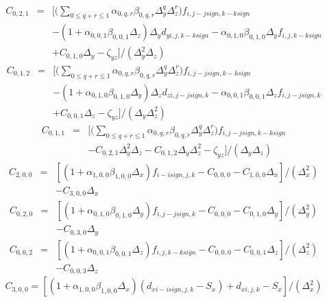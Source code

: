 \begin{eqnarray}
           C_{0,2,1}&=&{\bigg[}{\bigg(}{\sum_{\scriptstyle 0\le q+r\le 1}} \alpha_{0,q,r}\beta_{0,q,r}\Delta_y^q\Delta_z^r{\bigg)}f_{i,j-jsign,k-ksign} \nonumber \\
                  & &-(1+\alpha_{0,0,1}\beta_{0,0,1}\Delta_z)\Delta_yd_{yi,j,k-ksign}-\alpha_{0,1,0}\beta_{0,1,0}\Delta_yf_{i,j,k-ksign} \nonumber \\
                  & &+C_{0,1,0}\Delta_y-\zeta_{yz}{\bigg]}{\big /}(\Delta_y^2\Delta_z)
\end{eqnarray}
\begin{eqnarray}
           C_{0,1,2}&=&{\bigg[}{\bigg(}{\sum_{\scriptstyle 0\le q+r\le 1}} \alpha_{0,q,r}\beta_{0,q,r}\Delta_y^q\Delta_z^r{\bigg)}f_{i,j-jsign,k-ksign} \nonumber \\
                  & &-(1+\alpha_{0,1,0}\beta_{0,1,0}\Delta_y)\Delta_zd_{zi,j-jsign,k}-\alpha_{0,0,1}\beta_{0,0,1}\Delta_zf_{i,j-jsign,k} \nonumber \\
                  & &+C_{0,0,1}\Delta_z-\zeta_{yz}{\bigg]}{\big /}(\Delta_y\Delta_z^2)
\end{eqnarray}
\begin{eqnarray}
           C_{0,1,1}&=&{\bigg[}{\bigg(}{\sum_{\scriptstyle 0\le q+r\le 1}} \alpha_{0,q,r}\beta_{0,q,r}\Delta_y^q\Delta_z^r{\bigg)}f_{i,j-jsign,k-ksign} \nonumber \\
                  & &-C_{0,2,1}\Delta_y^2\Delta_z-C_{0,1,2}\Delta_y\Delta_z^2-\zeta_{yz}{\bigg]}{\big /}(\Delta_y\Delta_z)
\end{eqnarray}
\begin{eqnarray}
           C_{2,0,0}&=&[(1+\alpha_{1,0,0}\beta_{1,0,0}\Delta_x)f_{i-isign,j,k}-C_{0,0,0}-C_{1,0,0}\Delta_x]/(\Delta_x^2) \nonumber \\
           & &-C_{3,0,0}\Delta_x
\end{eqnarray}
\begin{eqnarray}
           C_{0,2,0}&=&[(1+\alpha_{0,1,0}\beta_{0,1,0}\Delta_y)f_{i,j-jsign,k}-C_{0,0,0}-C_{0,1,0}\Delta_y]/(\Delta_y^2) \nonumber \\
           & &-C_{0,3,0}\Delta_y
\end{eqnarray}
\begin{eqnarray}
           C_{0,0,2}&=&[(1+\alpha_{0,0,1}\beta_{0,0,1}\Delta_z)f_{i,j,k-ksign}-C_{0,0,0}-C_{0,0,1}\Delta_z]/(\Delta_z^2) \nonumber \\
           & &-C_{0,0,3}\Delta_z
\end{eqnarray}
\begin{equation}
           C_{3,0,0}=[(1+\alpha_{1,0,0}\beta_{1,0,0}\Delta_x)(d_{xi-isign,j,k}-S_x)+d_{xi,j,k}-S_x]/(\Delta_x^2)
\end{equation}
